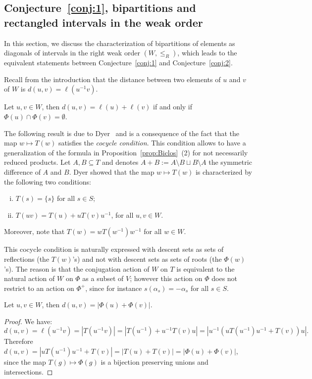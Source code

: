 \documentclass[Unicode]{cedram-alco}
\theoremstyle{definition}
\begin{document}
\subsection{Conjecture~\ref{conj:1}, bipartitions and rectangled intervals in the weak order}\label{ss:Rectangled}

In this section, we discuss the characterization of bipartitions of elements as diagonals of intervals in the right weak order $(W,\leq_R)$, which leads to the equivalent statements between  Conjecture~\ref{conj:1} and Conjecture~\ref{conj:2}. 

Recall from the introduction that the distance between two elements of $u$ and $v$ of $W$ is $d(u,v)=\ell(u^{-1}v)$. 

\begin{lemm}\label{lem:BH} Let $u,v\in W$, then $d(u,v)=\ell(u)+\ell(v)$ if and only if $\Phi(u)\cap\Phi(v)=\emptyset$. 
\end{lemm}

The following result is due to Dyer~\cite{Dy90} and is a consequence of the fact that the map $w\mapsto T(w)$ satisfies the {\em cocycle condition}. This condition allows  to have a generalization of the formula in Proposition~\ref{prop:Biclos}~(2) for not necessarily reduced products. Let $A,B\subseteq T$ and denotes $A+B:=A\setminus B\sqcup B\setminus A$ the symmetric difference of $A$ and $B$. Dyer showed that the map $w\mapsto T(w)$ is characterized by the following two conditions:
\begin{enumerate}[(i)]
\item $T(s)=\{s\}$ for all $s\in S$;
\item  $T(uv)=T(u)+uT(v)u^{-1}$, for all $u,v\in W$.
\end{enumerate}
Moreover, note that  $T(w)=wT(w^{-1})w^{-1}$ for all $w\in W$. 

\begin{remark} This cocycle condition is naturally expressed with descent sets as sets of reflections (the $T(w)$'s) and not with descent sets as sets of roots (the $\Phi(w)$'s). The reason is that the conjugation action of $W$ on $T$ is equivalent to the natural action of $W$ on $\Phi$ as a subset of $V$; however this action on $\Phi$ does not restrict to an action on $\Phi^+$, since for instance $s(\alpha_s)=-\alpha_s$ for all $s\in S$. 
\end{remark}

\begin{lemm}\label{lem:MaxInt} Let $u,v\in W$, then  $d(u,v)=|\Phi(u) + \Phi(v)|$. 
\end{lemm}
\begin{proof} We have:
$$
d(u,v)=\ell(u^{-1}v)=|T(u^{-1}v)|=|T(u^{-1})+u^{-1}T(v)u|=|u^{-1}(uT(u^{-1})u^{-1}+T(v))u|.
$$
Therefore $d(u,v)=|uT(u^{-1})u^{-1}+T(v)|=|T(u)+T(v)|=|\Phi(u)+\Phi(v)|$, since the map $T(g)\mapsto \Phi(g)$ is a bijection preserving unions and intersections. 
\end{proof}
\end{document}
